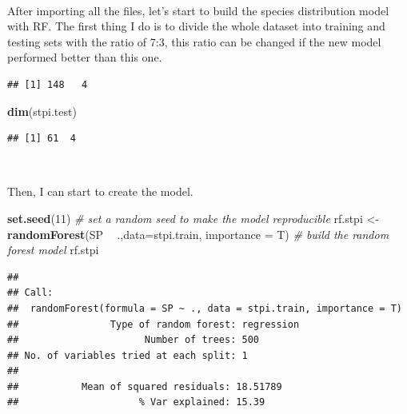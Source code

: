 \documentclass[
]{article}
\newenvironment{Shaded}{\begin{snugshade}}{\end{snugshade}}
\newcommand{\CommentTok}[1]{\textcolor[rgb]{0.56,0.35,0.01}{\textit{#1}}}
\newcommand{\DataTypeTok}[1]{\textcolor[rgb]{0.13,0.29,0.53}{#1}}
\newcommand{\DecValTok}[1]{\textcolor[rgb]{0.00,0.00,0.81}{#1}}
\newcommand{\FloatTok}[1]{\textcolor[rgb]{0.00,0.00,0.81}{#1}}
\newcommand{\KeywordTok}[1]{\textcolor[rgb]{0.13,0.29,0.53}{\textbf{#1}}}
\newcommand{\NormalTok}[1]{#1}
\newcommand{\OperatorTok}[1]{\textcolor[rgb]{0.81,0.36,0.00}{\textbf{#1}}}
\newcommand{\OtherTok}[1]{\textcolor[rgb]{0.56,0.35,0.01}{#1}}
\newcommand{\StringTok}[1]{\textcolor[rgb]{0.31,0.60,0.02}{#1}}
\begin{document}
~

After importing all the files, let's start to build the species
distribution model with RF. The first thing I do is to divide the whole
dataset into training and testing sets with the ratio of 7:3, this ratio
can be changed if the new model performed better than this one.

\begin{Shaded}
\end{Shaded}

\begin{verbatim}
## [1] 148   4
\end{verbatim}

\begin{Shaded}
\begin{Highlighting}[]
\KeywordTok{dim}\NormalTok{(stpi.test)}
\end{Highlighting}
\end{Shaded}

\begin{verbatim}
## [1] 61  4
\end{verbatim}

~

Then, I can start to create the model.

\begin{Shaded}
\begin{Highlighting}[]
\KeywordTok{set.seed}\NormalTok{(}\DecValTok{11}\NormalTok{) }\CommentTok{# set a random seed to make the model reproducible}
\NormalTok{rf.stpi <-}\StringTok{ }\KeywordTok{randomForest}\NormalTok{(SP }\OperatorTok{~}\StringTok{ }\NormalTok{.,}\DataTypeTok{data=}\NormalTok{stpi.train, }\DataTypeTok{importance =}\NormalTok{ T) }\CommentTok{# build the random forest model}
\NormalTok{rf.stpi}
\end{Highlighting}
\end{Shaded}

\begin{verbatim}
## 
## Call:
##  randomForest(formula = SP ~ ., data = stpi.train, importance = T) 
##                Type of random forest: regression
##                      Number of trees: 500
## No. of variables tried at each split: 1
## 
##           Mean of squared residuals: 18.51789
##                     % Var explained: 15.39
\end{verbatim}
\end{document}
